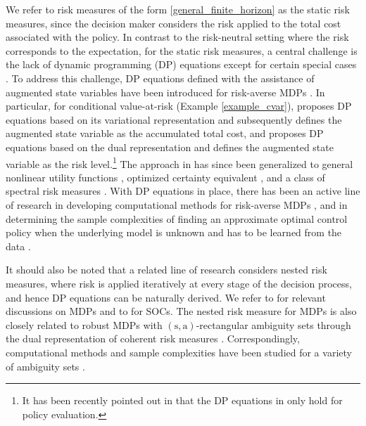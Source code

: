 \documentclass[9pt]{article}
\numberwithin{equation}{section}
\begin{document}
We refer to risk measures of the form \eqref{general_finite_horizon} as the static risk measures, since the decision maker considers the risk applied to the total cost associated with the policy. 
In contrast to the risk-neutral setting where the risk corresponds to the expectation, for the static risk measures, a central challenge is the lack of dynamic programming (DP) equations except for certain special cases \cite{fei2020risk}.
To address this challenge, DP equations defined with the assistance of augmented state variables have been introduced for risk-averse MDPs \cite{bauerle2011markov,chow2015risk,hau2023dynamic,bauerle2014more}. 
In particular, for conditional value-at-risk (Example \ref{example_cvar}), \cite{bauerle2011markov} proposes DP equations based on its variational representation and subsequently defines the augmented state variable as the accumulated total cost,
and \cite{chow2015risk} proposes DP equations based on the dual representation and defines the augmented state variable as the risk level.\footnote{It has been recently pointed out in \cite{hau2023dynamic} that the DP equations in \cite{chow2015risk} only hold for policy evaluation.} 
The approach in \cite{bauerle2011markov} has since been generalized to general nonlinear utility functions \cite{bauerle2014more,wu2023risk}, optimized certainty equivalent \cite{wang2024reductions}, and a class of spectral risk measures \cite{bastani2022regret}.
With DP equations in place, there has been an active line of research in developing computational methods for risk-averse MDPs \cite{chow2015risk,ding2022sequential,chow2014algorithms}, and in determining the sample complexities of finding an approximate optimal control policy when the underlying model is unknown and has to be learned from the data \cite{wang2023near,wu2023risk,wang2024reductions,ni2024risk,bastani2022regret}. 

It should also be noted that a related line of research considers nested risk measures, where risk is applied iteratively at every stage of the decision process, and hence DP equations can be naturally derived. 
We refer to \cite{ruszczynski2010risk,li2025rectangularity} for relevant  discussions on MDPs and to \cite{shapiro2025risk} for SOCs.
The nested risk measure for MDPs is also closely related to robust MDPs with $(\mathrm{s,a})$-rectangular ambiguity sets \cite{iyengar2005robust,nilim2005robust} through the dual representation of coherent risk measures \cite{shapiro2021lectures}.
Correspondingly, computational methods and sample complexities have been studied for a variety of ambiguity sets \cite{panaganti2022sample,wang2023finite,wang2022policy,wang2023policy,li2022first}.
\end{document}
